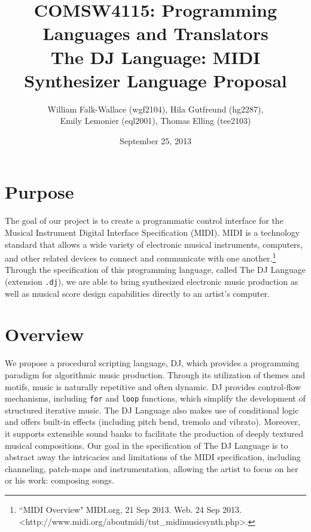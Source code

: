 \documentclass[letterpaper]{article}
\author{William Falk-Wallace (wgf2104), Hila Gutfreund (hg2287), \\Emily Lemonier (eql2001), Thomas Elling (tee2103)}
\title{COMSW4115: Programming Languages and Translators\\The DJ Language: MIDI Synthesizer Language Proposal}
\date{September 25, 2013}
\begin{document}
\maketitle
\tableofcontents 
\pagebreak[4]

\section{Purpose}
The goal of our project is to create a programmatic control interface for the Musical Instrument Digital Interface Specification (MIDI). MIDI is a technology standard that allows a wide variety of electronic musical instruments, computers, and other related devices to connect and communicate with one another.\footnote[1]{``MIDI Overview" MIDI.org, 21 Sep 2013. Web. 24 Sep 2013. \textless http://www.midi.org/aboutmidi/tut\_midimusicsynth.php\textgreater.}  
Through the specification of this programming language, called The DJ Language (extension \texttt{.dj}), we are able to bring synthesized electronic music production as well as musical score design capabilities directly to an artist's computer. 


\section{Overview}

We propose a procedural scripting language, DJ, which provides a programming paradigm for algorithmic music production. Through its utilization of themes and motifs, music is naturally repetitive and often dynamic. DJ provides control-flow mechanisms, including \texttt{for} and \texttt{loop} functions, which simplify the development of structured iterative music. The DJ Language also makes use of conditional logic and offers built-in effects (including pitch bend, tremolo and vibrato). Moreover, it supports extensible sound banks to facilitate the production of deeply textured musical compositions. Our goal in the specification of The DJ Language is to abstract away the intricacies and limitations of the MIDI specification, including channeling, patch-maps and instrumentation, allowing the artist to focus on her or his work: composing songs.
\end{document}
